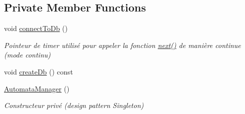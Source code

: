 \subsection*{Private Member Functions}
\begin{DoxyCompactItemize}
\item 
void \mbox{\hyperlink{class_automata_manager_a14ee46a98c19260dae2d51cea466c841}{connect\+To\+Db}} ()
\begin{DoxyCompactList}\small\item\em Pointeur de timer utilisé pour appeler la fonction \mbox{\hyperlink{class_automata_manager_ae7788f4fb5ae9c6f4ffaf6b471d969ad}{next()}} de manière continue (mode continu) \end{DoxyCompactList}\item 
void \mbox{\hyperlink{class_automata_manager_aae2a61e5d186c723c0e2f9b45bb2529c}{create\+Db}} () const
\item 
\mbox{\hyperlink{class_automata_manager_a9cdfbfc56a9ad2d2d0631d7a889c83e1}{Automata\+Manager}} ()
\begin{DoxyCompactList}\small\item\em Constructeur privé (design pattern Singleton) \end{DoxyCompactList}\end{DoxyCompactItemize}
